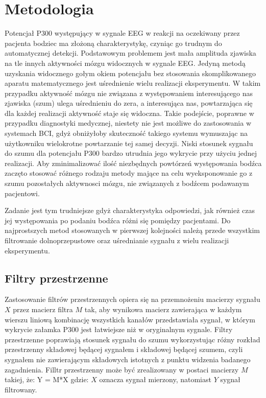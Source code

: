 \documentclass[licencjacka,openright]{pracamgr}
\begin{document}
\chapter{Metodologia}
Potencjał P300 występujący w sygnale EEG w reakcji na oczekiwany przez pacjenta bodziec ma złożoną charakterystykę, czyniąc go trudnym do automatycznej detekcji. Podstawowym problemem jest mała amplituda zjawiska na tle innych aktywności mózgu widocznych w sygnale EEG. Jedyną metodą uzyskania widocznego gołym okiem potencjału bez stosowania skomplikowanego aparatu matematycznego jest uśrednienie wielu realizacji eksperymentu. W takim przypadku aktywność mózgu nie związana z występowaniem interesującego nas zjawiska (szum) ulega uśrednieniu do zera, a interesująca nas, powtarzająca się dla każdej realizacji aktywność staje się widoczna. Takie podejście, poprawne w przypadku diagnostyki medycznej, niestety nie jest możliwe do zastosowania w systemach BCI, gdyż obniżyłoby skuteczność takiego systemu wymuszając na użytkowniku wielokrotne powtarzanie tej samej decyzji. Niski stosunek sygnału do szumu dla potencjału P300 bardzo utrudnia jego wykrycie przy użyciu jednej realizacji. Aby zminimalizować ilość niezbędnych powtórzeń występowania bodźca zaczęto stosować różnego rodzaju metody mające na celu wyeksponowanie go z szumu pozostałych aktywnosci mózgu, nie związanych z bodźcem podawanym pacjentowi.

Zadanie jest tym trudniejsze gdyż charakterystyka odpowiedzi, jak również czas jej występowania po podaniu bodźca różni się pomiędzy pacjentami. Do najprostszych metod stosowanych w pierwszej kolejności należą przede wszystkim filtrowanie dolnoprzepustowe oraz uśrednianie sygnału z wielu realizacji eksperymentu.

\section{Filtry przestrzenne}
Zastosowanie filtrów przestrzennych opiera się na przemnożeniu macierzy sygnału $X$ przez macierz filtra $M$ tak, aby wynikowa macierz zawierająca w każdym wierszu liniową kombinację wszystkich kanałów przedstawiała sygnał, w którym wykrycie załamka P300 jest łatwiejsze niż w oryginalnym sygnale. 
Filtry przestrzenne poprawiają stosunek sygnału do szumu wykorzystując różny rozkład przestrzenny składowej będącej sygnałem i składowej będącej szumem, czyli sygnałem nie zawierającym składowych istotnych z punktu widzenia badanego zagadnienia.
Filltr przestrzenny może być zrealizowany w postaci macierzy $M$ takiej, że: 
Y = M*X
gdzie: $X$ oznacza sygnał mierzony, natomiast $Y$ sygnał filtrowany.
\end{document}
